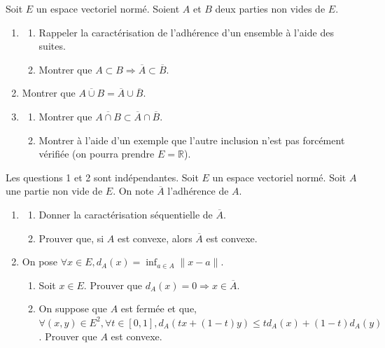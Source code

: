 \begin{exercice}
Soit $E$ un espace vectoriel normé. Soient $A$ et $B$ deux parties non vides de $E$.
\begin{enumerate}
    \item 
    \begin{enumerate}
        \item Rappeler la caractérisation de l'adhérence d'un ensemble à l'aide des suites.
        \item Montrer que $A \subset B \Rightarrow \overline{A} \subset \overline{B}$.
    \end{enumerate}
    \item Montrer que $\overline{A \cup B} = \overline{A} \cup \overline{B}$.
    \item 
    \begin{enumerate}
        \item Montrer que $\overline{A \cap B} \subset \overline{A} \cap \overline{B}$.
        \item Montrer à l'aide d'un exemple que l'autre inclusion n'est pas forcément vérifiée (on pourra prendre $E=\mathbb{R}$).
    \end{enumerate}
\end{enumerate}
\end{exercice}

\begin{exercice}
Les questions 1 et 2 sont indépendantes. Soit $E$ un espace vectoriel normé. Soit $A$ une partie non vide de $E$. On note $\overline{A}$ l'adhérence de $A$.
\begin{enumerate}
    \item 
    \begin{enumerate}
        \item Donner la caractérisation séquentielle de $\overline{A}$.
        \item Prouver que, si $A$ est convexe, alors $\overline{A}$ est convexe.
    \end{enumerate}
    \item On pose $\forall x \in E, d_{A}(x) = \inf_{a \in A} \|x-a\|$.
    \begin{enumerate}
        \item Soit $x \in E$. Prouver que $d_{A}(x) = 0 \Rightarrow x \in \overline{A}$.
        \item On suppose que $A$ est fermée et que, $\forall (x,y) \in E^{2}, \forall t \in [0,1], d_{A}(tx+(1-t)y) \le t d_{A}(x) + (1-t) d_{A}(y)$. Prouver que $A$ est convexe.
    \end{enumerate}
\end{enumerate}
\end{exercice}

